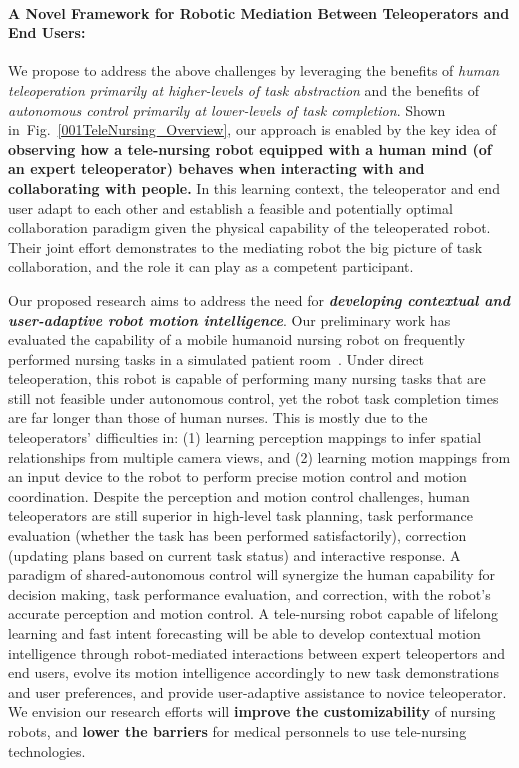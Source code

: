 \documentclass[letterpaper, 11 pt, onecolumn]{article}
\newcommand{\fig}[1]{Fig.~\ref{#1}}
\begin{document}
\paragraph*{A Novel Framework for Robotic Mediation Between Teleoperators and End Users:} We propose to address the above challenges by leveraging the benefits of {\it human teleoperation primarily at higher-levels of task abstraction} and the benefits of {\it autonomous control primarily at lower-levels of task completion}. Shown in~\fig{001TeleNursing_Overview}, our approach is enabled by the key idea of {\bf observing how a tele-nursing robot equipped with a human mind (of an expert teleoperator) behaves when interacting with and collaborating with people.} In this learning context, the teleoperator and end user adapt to each other and establish a feasible and potentially optimal collaboration paradigm given the physical capability of the teleoperated robot. Their joint effort demonstrates to the mediating robot the big picture of task collaboration, and the role it can play as a competent participant. 
 
Our proposed research aims to address the need for \textit{\textbf{developing contextual and user-adaptive robot motion intelligence}}.
Our preliminary work has evaluated the capability of a mobile humanoid nursing robot on frequently performed nursing tasks in a simulated patient room~\cite{Hauser_Li_TRINA:17}. Under direct teleoperation, this robot is capable of performing many nursing tasks that are still not feasible under autonomous control, yet the robot task completion times are far longer than those of human nurses. This is mostly due to the teleoperators' difficulties in: (1) learning perception mappings to infer spatial relationships from multiple camera views, and (2) learning motion mappings from an input device to the robot to perform precise motion control and motion coordination. Despite the perception and motion control challenges, human teleoperators are still superior in high-level task planning, task performance evaluation (whether the task has been performed satisfactorily), correction (updating plans based on current task status) and interactive response. A paradigm of shared-autonomous control will synergize the human capability for decision making, task performance evaluation, and correction, with the robot's accurate perception and motion control. A tele-nursing robot capable of lifelong learning and fast intent forecasting will be able to develop contextual motion intelligence through robot-mediated interactions between expert teleopertors and end users, evolve its motion intelligence accordingly to new task demonstrations and user preferences, and provide user-adaptive assistance to novice teleoperator. We envision our research efforts will \textbf{improve the customizability} of nursing robots, and \textbf{lower the barriers} for medical personnels to use tele-nursing technologies. 
\end{document}
